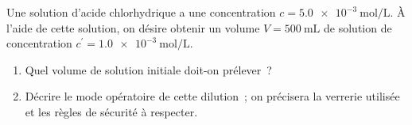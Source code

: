 Une solution d'acide chlorhydrique a une concentration
$c=\qty{5.0e-3}{\mol\per\L}$. À l'aide de cette solution, on désire obtenir un
volume $V=\qty{500}{\mL}$ de solution de concentration
$c^{\prime}=\qty{1.0e-3}{\mol\per\L}$.
\begin{enumerate}
    \item Quel volume de solution initiale doit-on prélever~?
    \item Décrire le mode opératoire de cette dilution~; on précisera la
          verrerie utilisée et les règles de sécurité à respecter.
\end{enumerate}

